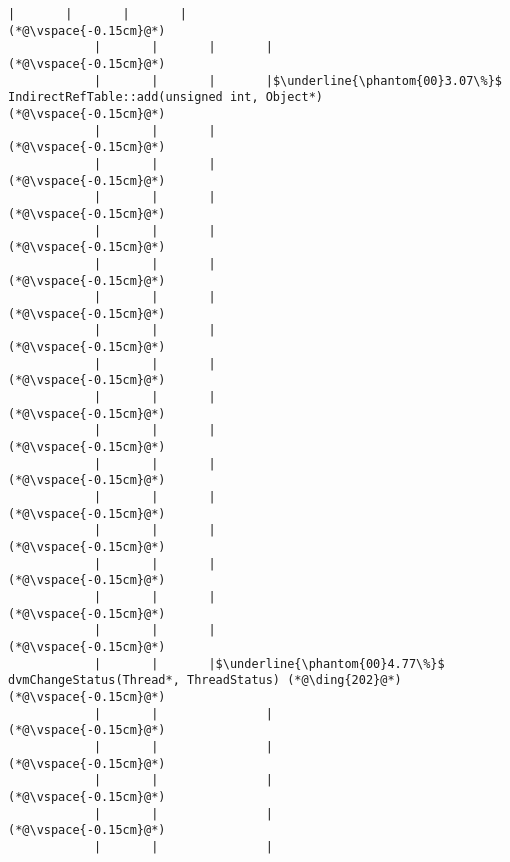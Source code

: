 \begin{lstlisting}[caption=Staattinen metodi Java$\to$C , label=profile:J2CBenchmark00001, numberbychapter=true, frame=lines, float, floatplacement=t]
            |       |       |       |
(*@\vspace{-0.15cm}@*)
            |       |       |       |
(*@\vspace{-0.15cm}@*)
            |       |       |       |$\underline{\phantom{00}3.07\%}$ IndirectRefTable::add(unsigned int, Object*)
(*@\vspace{-0.15cm}@*)
            |       |       |        
(*@\vspace{-0.15cm}@*)
            |       |       |        
(*@\vspace{-0.15cm}@*)
            |       |       |        
(*@\vspace{-0.15cm}@*)
            |       |       |        
(*@\vspace{-0.15cm}@*)
            |       |       |        
(*@\vspace{-0.15cm}@*)
            |       |       |        
(*@\vspace{-0.15cm}@*)
            |       |       |        
(*@\vspace{-0.15cm}@*)
            |       |       |        
(*@\vspace{-0.15cm}@*)
            |       |       |        
(*@\vspace{-0.15cm}@*)
            |       |       |        
(*@\vspace{-0.15cm}@*)
            |       |       |        
(*@\vspace{-0.15cm}@*)
            |       |       |        
(*@\vspace{-0.15cm}@*)
            |       |       |        
(*@\vspace{-0.15cm}@*)
            |       |       |        
(*@\vspace{-0.15cm}@*)
            |       |       |
(*@\vspace{-0.15cm}@*)
            |       |       |
(*@\vspace{-0.15cm}@*)
            |       |       |$\underline{\phantom{00}4.77\%}$ dvmChangeStatus(Thread*, ThreadStatus) (*@\ding{202}@*)
(*@\vspace{-0.15cm}@*)
            |       |               |
(*@\vspace{-0.15cm}@*)
            |       |               |
(*@\vspace{-0.15cm}@*)
            |       |               |
(*@\vspace{-0.15cm}@*)
            |       |               |
(*@\vspace{-0.15cm}@*)
            |       |               |

\end{lstlisting}
